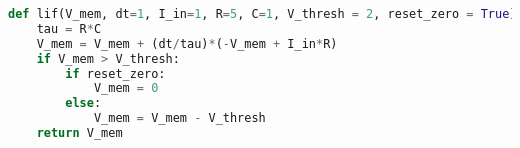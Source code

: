 \begin{lstlisting}[language=Python, caption={Python implementation of the action potential full simulation of a LIF: $I_{in}=1$, $V_{thresh} = 2$ is threshold}, label={lst:membranepotentialfull}]
def lif(V_mem, dt=1, I_in=1, R=5, C=1, V_thresh = 2, reset_zero = True):
	tau = R*C
	V_mem = V_mem + (dt/tau)*(-V_mem + I_in*R)
	if V_mem > V_thresh:
		if reset_zero:
			V_mem = 0
		else:
			V_mem = V_mem - V_thresh
	return V_mem
\end{lstlisting}
